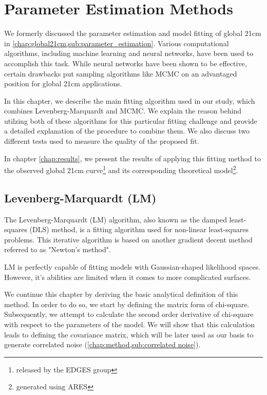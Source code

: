 \documentclass[12pt, TexShade, letterpaper]{report}
\begin{document}
\chapter{Parameter Estimation Methods}
\label{chap:method}
We formerly discussed the parameter estimation and model fitting of global 21cm in \ref{chap:global21cm,sub:parameter_estimation}. Various computational algorithms, including machine learning and neural networks, have been used to accomplish this task. While neural networks have been shown to be effective, certain drawbacks put sampling algorithms like MCMC on an advantaged position for global 21cm applications.\par
In this chapter, we describe the main fitting algorithm used in our study, which combines Levenberg-Marquardt and MCMC. We explain the reason behind utilzing both of these algorithms for this particular fitting challenge and provide a detailed explanation of the procedure to combine them. We also discuss two different tests used to measure the quality of the proposed fit.\par
In chapter \ref{chap:results}, we present the results of applying this fitting method to the observed global 21cm curve\footnote{released by the EDGES group} and its corresponding theoretical model\footnote{generated using ARES}.
\section{Levenberg-Marquardt (LM)}
\label{chap:method,sub:LM}
The Levenberg-Marquardt (LM) algorithm, also known as the damped least-squares (DLS) method, is a fitting algorithm used for non-linear least-squares problems. This iterative algorithm is based on another gradient decent method referred to as "Newton's method".\par
LM is perfectly capable of fitting models with Gaussian-shaped likelihood spaces. However, it's abilities are limited when it comes to more complicated surfaces.\par
We continue this chapter by deriving the basic analytical definition of this method. In order to do so, we start by defining the matrix form of chi-square. Subsequently, we attempt to calculate the second order derivative of chi-square with respect to the parameters of the model. We will show that this calculation leads to defining the covariance matrix, which will be later used as our basis to generate correlated noise (\ref{chap:method,sub:correlated noise}).\par
\end{document}
